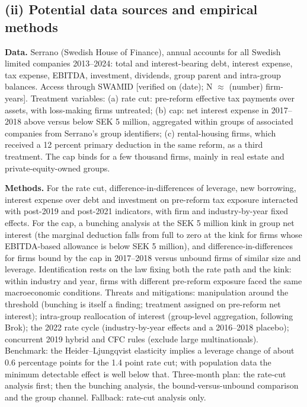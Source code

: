 \documentclass[12pt,a4paper]{article}
\begin{document}
\subsection{(ii) Potential data sources and empirical methods}

\textbf{Data.} Serrano (Swedish House of Finance), annual accounts for all Swedish limited companies 2013--2024: total and interest-bearing debt, interest expense, tax expense, EBITDA, investment, dividends, group parent and intra-group balances. Access through SWAMID [verified on (date); N $\approx$ (number) firm-years]. Treatment variables: (a) rate cut: pre-reform effective tax payments over assets, with loss-making firms untreated; (b) cap: net interest expense in 2017--2018 above versus below SEK 5 million, aggregated within groups of associated companies from Serrano's group identifiers; (c) rental-housing firms, which received a 12 percent primary deduction in the same reform, as a third treatment. The cap binds for a few thousand firms, mainly in real estate and private-equity-owned groups.

\textbf{Methods.} For the rate cut, difference-in-differences of leverage, new borrowing, interest expense over debt and investment on pre-reform tax exposure interacted with post-2019 and post-2021 indicators, with firm and industry-by-year fixed effects. For the cap, a bunching analysis at the SEK 5 million kink in group net interest (the marginal deduction falls from full to zero at the kink for firms whose EBITDA-based allowance is below SEK 5 million), and difference-in-differences for firms bound by the cap in 2017--2018 versus unbound firms of similar size and leverage. Identification rests on the law fixing both the rate path and the kink: within industry and year, firms with different pre-reform exposure faced the same macroeconomic conditions. Threats and mitigations: manipulation around the threshold (bunching is itself a finding; treatment assigned on pre-reform net interest); intra-group reallocation of interest (group-level aggregation, following Brok); the 2022 rate cycle (industry-by-year effects and a 2016--2018 placebo); concurrent 2019 hybrid and CFC rules (exclude large multinationals). Benchmark: the Heider--Ljungqvist elasticity implies a leverage change of about 0.6 percentage points for the 1.4 point rate cut; with population data the minimum detectable effect is well below that. Three-month plan: the rate-cut analysis first; then the bunching analysis, the bound-versus-unbound comparison and the group channel. Fallback: rate-cut analysis only.
\end{document}
